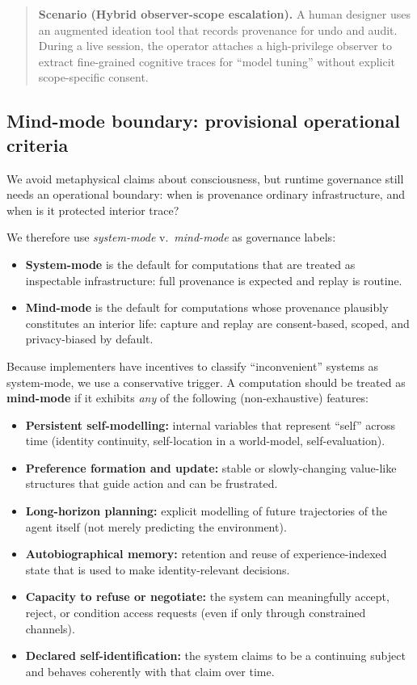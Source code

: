 \documentclass[11pt]{article}
\theoremstyle{definition}
\theoremstyle{plain}
\theoremstyle{remark}
\begin{document}
\begin{quote}\small
\textbf{Scenario (Hybrid observer-scope escalation).}
A human designer uses an augmented ideation tool that records provenance for undo and audit.
During a live session, the operator attaches a high-privilege observer to extract fine-grained cognitive traces for ``model tuning'' without explicit scope-specific consent.
\end{quote}

\subsection{Mind-mode boundary: provisional operational criteria}
\label{sec:mindmode}

We avoid metaphysical claims about consciousness, but runtime governance still needs an operational boundary:
when is provenance ordinary infrastructure, and when is it protected interior trace?

We therefore use \emph{system-mode} v.\ \emph{mind-mode} as governance labels:
\begin{itemize}[leftmargin=*]
  \item \textbf{System-mode} is the default for computations that are treated as
    inspectable infrastructure: full provenance is expected and replay is routine.
  \item \textbf{Mind-mode} is the default for computations whose provenance plausibly
    constitutes an interior life: capture and replay are consent-based, scoped, and
    privacy-biased by default.
\end{itemize}

Because implementers have incentives to classify ``inconvenient'' systems as system-mode, we use a conservative trigger.
A computation should be treated as \textbf{mind-mode} if it exhibits \emph{any}
of the following (non-exhaustive) features:

\begin{itemize}[leftmargin=*]
  \item \textbf{Persistent self-modelling:} internal variables that represent ``self''
    across time (identity continuity, self-location in a world-model, self-evaluation).
  \item \textbf{Preference formation and update:} stable or slowly-changing value-like
    structures that guide action and can be frustrated.
  \item \textbf{Long-horizon planning:} explicit modelling of future trajectories of
    the agent itself (not merely predicting the environment).
  \item \textbf{Autobiographical memory:} retention and reuse of experience-indexed
    state that is used to make identity-relevant decisions.
  \item \textbf{Capacity to refuse or negotiate:} the system can meaningfully accept,
    reject, or condition access requests (even if only through constrained channels).
  \item \textbf{Declared self-identification:} the system claims to be a continuing
    subject and behaves coherently with that claim over time.
\end{itemize}
\end{document}
